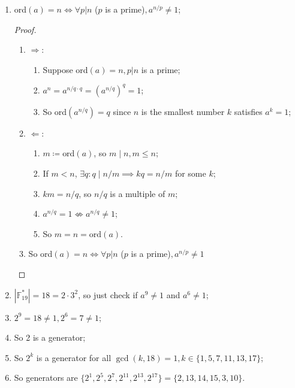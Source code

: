 \documentclass{article}
\begin{document}
\begin{enumerate}
    \begin{enumerate}
        \item ord$(a)=n\iff \forall p|n$ ($p$ is a prime)$,a^{n/p}\ne1$;
        \begin{proof}
        ~
            \begin{enumerate}
                \item $\Rightarrow$:
                \begin{enumerate}
                    \item Suppose ord$(a)=n,p|n$ is a prime;
                    \item $a^n=a^{n/q\cdot q}=(a^{n/q})^q=1$;
                    \item So ord$(a^{n/q})=q$ since $n$ is the smallest number $k$ satisfies $a^k=1$;
                \end{enumerate}
                \item $\Leftarrow$:
                \begin{enumerate}
                    \item $m\coloneqq $ord$(a)$, so $m\mid n,m\leq n$;
                    \item If $m<n$, $\exists q:q\mid n/m\implies kq=n/m$ for some $k$;
                    \item $km=n/q$, so $n/q$ is a multiple of $m$;
                    \item $a^{n/q}=1\nLeftrightarrow a^{n/q}\ne1$;
                    \item So $m=n=\text{ord}(a)$.
                \end{enumerate}
                \item So ord$(a)=n\iff \forall p|n$ ($p$ is a prime)$,a^{n/p}\ne1$
            \end{enumerate}
        \end{proof}
        \item $|\mathbb{F}_{19}^*|=18=2\cdot 3^2$, so just check if $a^9\ne 1$ and $a^6\ne 1$;
        \item $2^9=18\ne1, 2^6=7\ne1$;
        \item So 2 is a generator;
        \item So $2^k$ is a generator for all $\gcd(k,18)=1,k\in \{1,5,7,11,13,17\}$;
        \item So generators are $\{2^1,2^5,2^7,2^{11},2^{13},2^{17}\}=\{2,13,14,15,3,10\}$.
    \end{enumerate}
\end{enumerate}
\end{document}
